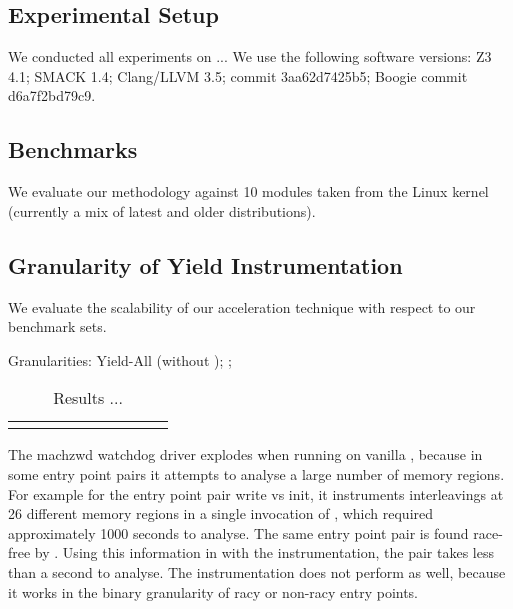 \subsection{Experimental Setup}
\label{eval:setup}

We conducted all experiments on ... We use the following software versions: Z3 4.1; SMACK 1.4; Clang/LLVM 3.5; \corral commit 3aa62d7425b5; Boogie commit d6a7f2bd79c9.

\subsection{Benchmarks}
\label{eval:benchmarks}

We evaluate our methodology against 10 modules taken from the Linux kernel (currently a mix of latest and older distributions).

\subsection{Granularity of Yield Instrumentation}
\label{eval:granularity}

We evaluate the scalability of our acceleration technique with respect to our benchmark sets.

Granularities: Yield-All (\corral without \whoop); \yieldcoarse; \yieldmr

\newcommand{\colspacing}{\hspace{1.8em}}
\begin{table*}[t]
\small
\centering
\begin{tabular}{l rrr rr rr r r}
\centering

\end{tabular}
\caption{Results ...}
\label{tab:granularity}
\end{table*}

The machzwd watchdog driver explodes when running on vanilla \corral, because in some entry point pairs it attempts to analyse a large number of memory regions. For example for the entry point pair write vs init, it instruments interleavings at 26 different memory regions in a single invocation of \corral, which required approximately 1000 seconds to analyse. The same entry point pair is found race-free by \whoop. Using this information in \corral with the \yieldmr instrumentation, the pair takes less than a second to analyse. The \yieldcoarse instrumentation does not perform as well, because it works in the binary granularity of racy or non-racy entry points.